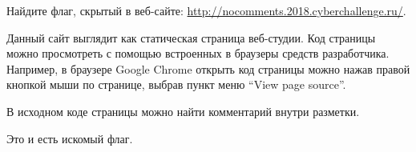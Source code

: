 
Найдите флаг, скрытый в веб-сайте: \url{http://nocomments.2018.cyberchallenge.ru/}.

\solutionSection

Данный сайт выглядит как статическая страница веб-студии. Код страницы можно просмотреть с помощью встроенных в браузеры средств разработчика. Например, в браузере Google Chrome открыть код страницы можно нажав правой кнопкой мыши по странице, выбрав пункт меню “View page source”. 

В исходном коде страницы можно найти комментарий внутри разметки.


Это и есть искомый флаг.

